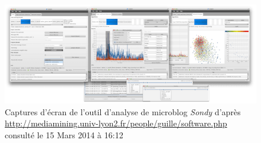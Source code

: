 \documentclass[11pt,a4paper]{Thesis}
\begin{document}
\begin{figure}
    \includegraphics[scale=.7]{figures/chap3/sondy.png}
    \caption[Captures d'écran de l'outil d'analyse de microblog Sondy]{Captures d'écran de l'outil d'analyse de microblog \textit{Sondy} d'après \url{http://mediamining.univ-lyon2.fr/people/guille/software.php} consulté le 15 Mars 2014 à 16:12}
    \label{fig:sondy}
\end{figure}




% 



\begin{spacing}{1.5} %



\mainmatter

% 





% 

\end{spacing}


% 
% 

% 
% 
\end{document}
